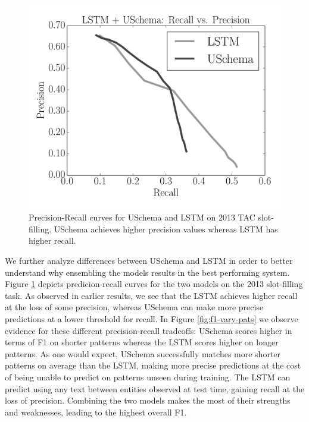 \begin{figure}
\begin{center}
\includegraphics[scale=0.45]{pr-curve}
\caption{Precision-Recall curves for USchema and LSTM on 2013 TAC slot-filling. USchema achieves higher precision values whereas LSTM has higher recall. \label{fig:pr-curve}}
\end{center}
\end{figure}

We further analyze differences between USchema and LSTM in order to better understand why ensembling the models results in the best performing system. Figure \ref{fig:pr-curve} depicts predicion-recall curves for the two models on the 2013 slot-filling task. As observed in earlier results, we see that the LSTM achieves higher recall at the loss of some precision, whereas USchema can make more precise predictions at a lower threshold for recall. In Figure \ref{fig:f1-vary-pats} we observe evidence for these different precision-recall tradeoffs: USchema scores higher in terms of F1 on shorter patterns whereas the LSTM scores higher on longer patterns. As one would expect, USchema successfully matches more shorter patterns on average than the LSTM, making more precise predictions at the cost of being unable to predict on patterns unseen during training. The LSTM can predict using any text between entities observed at test time, gaining recall at the loss of precision. Combining the two models makes the most of their strengths and weaknesses, leading to the highest overall F1.

